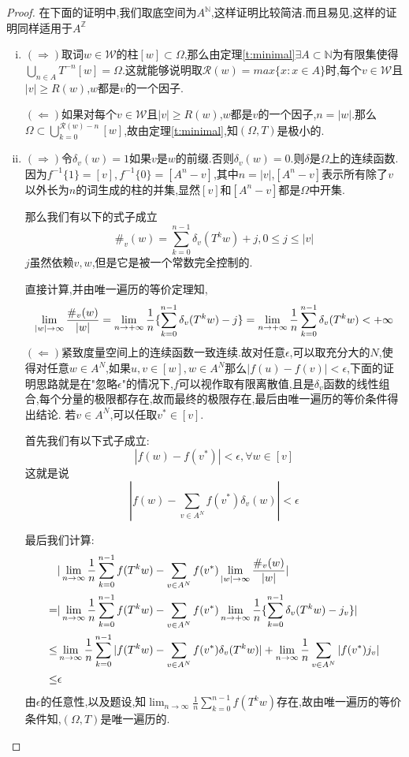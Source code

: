 \documentclass[a4paper,11pt,oneside]{book}
\begin{document}
\begin{proof}
在下面的证明中,我们取底空间为$A^{\mathbb{N}}$,这样证明比较简洁.而且易见,这样的证明同样适用于$A^{\mathbb{Z}}$
\begin{enumerate}[(i)]
\item $(\Rightarrow)$取词$w\in\mathcal{W}$的柱$[w]\subset \Omega$,那么由定理\ref{t:minimal}$\exists A\subset\mathbb{N}$为有限集使得$\bigcup_{n\in A} T^{-n}[w]=\Omega$.这就能够说明取$\mathcal{R}(w)=max\{x:x\in A\}$时,每个$v\in \mathcal{W}$且$|v|\geq R(w)$,$w$都是$v$的一个因子.

$(\Leftarrow)$如果对每个$v\in \mathcal{W}$且$|v|\geq R(w)$,$w$都是$v$的一个因子,$n=|w|$.那么$\Omega\subset \bigcup_{k=0}^{\mathcal{R}(w)-n}[w]$,故由定理\ref{t:minimal},知$(\Omega,T)$是极小的.
\item $(\Rightarrow)$令$\delta_v(w)=1$如果$v$是$w$的前缀.否则$\delta_v(w)=0$.则$\delta$是$\Omega$上的连续函数.因为$f^{-1}\{1\}=[v],f^{-1}\{0\}=[A^{n}-v]$,其中$n=|v|$,$[A^{n}-v]$表示所有除了$v$以外长为$n$的词生成的柱的并集,显然$[v]$和$[A^{n}-v]$都是$\Omega$中开集.

那么我们有以下的式子成立$$\#_v(w)=\sum_{k=0}^{n-1}\delta_v(T^kw)+j,0\leq j\leq |v|$$
$j$虽然依赖$v,w$,但是它是被一个常数完全控制的.

直接计算,并由唯一遍历的等价定理知,
$$
\lim_{|w| \to \infty}{\#_v(w)\over |w |}=\lim_{n\to +\infty}\frac{1}{n}\{\sum_{k=0}^{n-1}\delta_v(T^kw)-j\}=\lim_{n\to +\infty}\frac{1}{n}\sum_{k=0}^{n-1}\delta_v(T^kw)<+\infty
$$
$(\Leftarrow)$紧致度量空间上的连续函数一致连续.故对任意$\epsilon$,可以取充分大的$N$,使得对任意$w\in A^{N}$,如果$u,v\in [w],w\in A^{N}$那么$|f(u)-f(v)|<\epsilon$,下面的证明思路就是在"忽略$\epsilon$"的情况下,$f$可以视作取有限离散值,且是$\delta_v$函数的线性组合,每个分量的极限都存在,故而最终的极限存在,最后由唯一遍历的等价条件得出结论.
若$v\in A^N$,可以任取$v^*\in [v]$.

首先我们有以下式子成立:
$$|f(w)-f(v^*)|<\epsilon,\forall w\in [v]$$
这就是说$$|f(w)-\sum_{v\in A^N}f(v^*)\delta_v(w)|<\epsilon$$

最后我们计算:
\begin{align*}
&|\lim_{n\to \infty}\frac{1}{n}\sum_{k=0}^{n-1}f(T^kw)
-\sum_{v\in A^{N}}f(v^*)\lim_{|w| \to \infty}{\#_v(w)\over |w |}|\\
=&|\lim_{n\to \infty}\frac{1}{n}\sum_{k=0}^{n-1}f(T^kw)
-\sum_{v\in A^{N}}f(v^*)\lim_{n\to +\infty}\frac{1}{n}\{\sum_{k=0}^{n-1}\delta_v(T^kw)-j_v\}|\\
\leq&\lim_{n\to \infty}\frac{1}{n}\sum_{k=0}^{n-1}|f(T^kw)-\sum_{v\in A^N}f(v^*)\delta_v(T^kw)|+\lim_{n\to \infty}\frac{1}{n}\sum_{v\in A^N}|f(v^*)j_v|\\
\leq&\epsilon
\end{align*}
由$\epsilon$的任意性,以及题设,知$\lim_{n\to \infty}\frac{1}{n}\sum_{k=0}^{n-1}f(T^kw)$存在,故由唯一遍历的等价条件知,$(\Omega,T)$是唯一遍历的.

\end{enumerate}
\end{proof}
\end{document}
